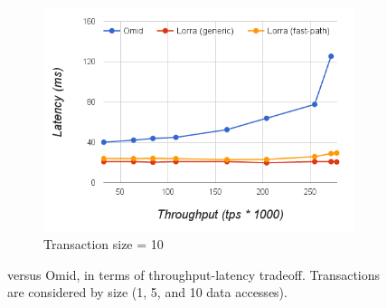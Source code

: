 \begin{figure}
\begin{subfigure}[t]{0.33\textwidth}
	\includegraphics[width=\textwidth]{figs/thpt-latency-10.png}
	\caption[]{Transaction size = 10}
    \label{fig:tl-10}
  \end{subfigure}			
  \caption{{\sys} versus Omid, in terms of throughput-latency tradeoff. Transactions are considered
by size (1, 5, and 10 data accesses). }
  \label{fig:throughput-latency}
\end{figure}

